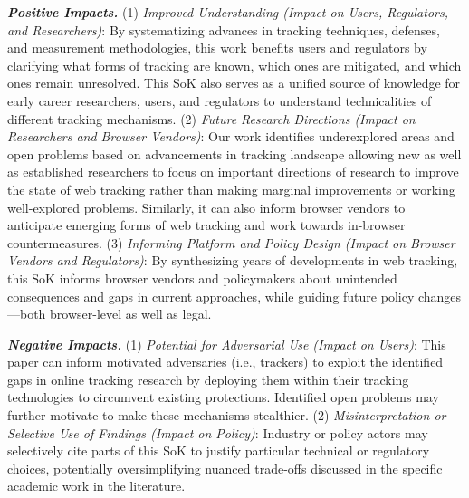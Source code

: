\noindent \textbf{\textit{Positive Impacts.}} 
%
(1) \textit{Improved Understanding (Impact on Users, Regulators, and Researchers)}: 
%
By systematizing advances in tracking techniques, defenses, and measurement methodologies, this work benefits users and regulators by clarifying what forms of tracking are known, which ones are mitigated, and which ones remain unresolved. 
%
This SoK also serves as a unified source of knowledge for early career researchers, users, and regulators to understand technicalities of different tracking mechanisms. 
%
(2) \textit{Future Research Directions (Impact on Researchers and Browser Vendors)}: 
%
Our work identifies underexplored areas and open problems based on advancements in tracking landscape allowing new as well as established researchers to focus on important directions of research to improve the state of web tracking rather than making marginal improvements or working well-explored problems. 
%
Similarly, it can also inform browser vendors to anticipate emerging forms of web tracking and work towards in-browser countermeasures. 
%
(3) \textit{Informing Platform and Policy Design (Impact on Browser Vendors and Regulators)}: 
%
By synthesizing years of developments in web tracking, this SoK informs browser vendors and policymakers about unintended consequences and gaps in current approaches, while guiding future policy changes---both browser-level as well as legal. 

\noindent \textbf{\textit{Negative Impacts.}} 
%
(1) \textit{Potential for Adversarial Use (Impact on Users)}: 
%
This paper can inform motivated adversaries (i.e., trackers) to exploit the identified gaps in online tracking research by deploying them within their tracking technologies to circumvent existing protections. 
%
Identified open problems may further motivate to make these mechanisms stealthier.
%
(2) \textit{Misinterpretation or Selective Use of Findings (Impact on Policy)}: 
%
Industry or policy actors may selectively cite parts of this SoK to justify particular technical or regulatory choices, potentially oversimplifying nuanced trade-offs discussed in the specific academic work in the literature.\\ 


